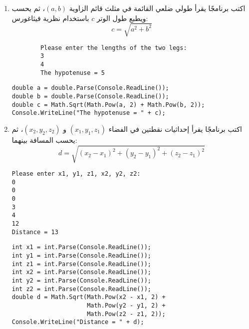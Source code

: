 \documentclass[12pt]{article}
\begin{document}
\begin{enumerate}[itemsep=3em]
    \item
    اكتب برنامجًا يقرأ طولي ضلعي القائمة في مثلث قائم الزاوية $(a, b)$، ثم يحسب ويطبع طول الوتر $c$ باستخدام نظرية فيثاغورس:
    \[
        c = \sqrt{a^2 + b^2}
    \]
    \ifdetailed
    \begin{example}
        \begin{english}
    \begin{lstlisting}
        Please enter the lengths of the two legs:
        3
        4
        The hypotenuse = 5
    \end{lstlisting}
\end{english}
\end{example}
\ifwithsols
\begin{solution}
    \begin{english}
        \begin{lstlisting}
double a = double.Parse(Console.ReadLine());
double b = double.Parse(Console.ReadLine());
double c = Math.Sqrt(Math.Pow(a, 2) + Math.Pow(b, 2));
Console.WriteLine("The hypotenuse = " + c);
        \end{lstlisting}
    \end{english}
\end{solution}
\fi
\clearpage
\fi
    \item
    اكتب برنامجًا يقرأ إحداثيات نقطتين في الفضاء $(x_1,y_1,z_1)$ و $(x_2,y_2,z_2)$، ثم يحسب المسافة بينهما:
    \[
    d = \sqrt{(x_2-x_1)^2 + (y_2-y_1)^2 + (z_2-z_1)^2}
    \]
    \ifdetailed
    \begin{example}
    \begin{english}
    \begin{lstlisting}
Please enter x1, y1, z1, x2, y2, z2:
0
0
0
3
4
12
Distance = 13
    \end{lstlisting}
    \end{english}
    \end{example}
    \ifwithsols
    \begin{solution}
    \begin{english}
    \begin{lstlisting}
int x1 = int.Parse(Console.ReadLine());
int y1 = int.Parse(Console.ReadLine());
int z1 = int.Parse(Console.ReadLine());
int x2 = int.Parse(Console.ReadLine());
int y2 = int.Parse(Console.ReadLine());
int z2 = int.Parse(Console.ReadLine());
double d = Math.Sqrt(Math.Pow(x2 - x1, 2) +
                     Math.Pow(y2 - y1, 2) +
                     Math.Pow(z2 - z1, 2));
Console.WriteLine("Distance = " + d);
    \end{lstlisting}
    \end{english}
    \end{solution}
    \clearpage
    \fi
    \fi



\end{enumerate}
\end{document}
